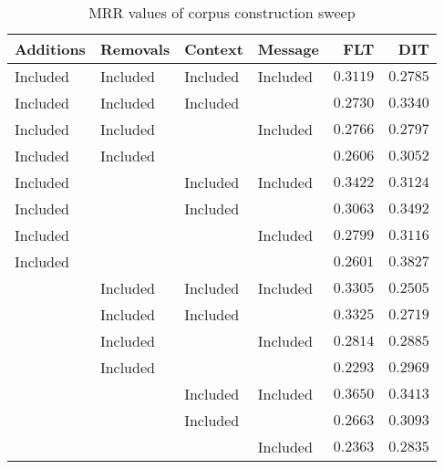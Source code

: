 
\begin{table}
\begin{spacing}{1.2}
\centering
\caption{MRR values of \mahout corpus construction sweep}
\label{table:mahout_corpus_sweep}
\vspace{0.2em}
\begin{tabular}{llll|rr}
\toprule
Additions &  Removals &   Context &   Message &           FLT &           DIT \\
\midrule
 Included &  Included &  Included &  Included &      $0.3119$ &      $0.2785$ \\
 \myrowcolor Included &  Included &  Included &           &      $0.2730$ &      $0.3340$ \\
 Included &  Included &           &  Included &      $0.2766$ &      $0.2797$ \\
 Included &  Included &           &           &      $0.2606$ &      $0.3052$ \\
 Included &           &  Included &  Included &      $0.3422$ &      $0.3124$ \\
 Included &           &  Included &           &      $0.3063$ &      $0.3492$ \\
 Included &           &           &  Included &      $0.2799$ &      $0.3116$ \\
 Included &           &           &           &      $0.2601$ & $\bm{0.3827}$ \\
          &  Included &  Included &  Included &      $0.3305$ &      $0.2505$ \\
          &  Included &  Included &           &      $0.3325$ &      $0.2719$ \\
          &  Included &           &  Included &      $0.2814$ &      $0.2885$ \\
          &  Included &           &           &      $0.2293$ &      $0.2969$ \\
          &           &  Included &  Included & $\bm{0.3650}$ &      $0.3413$ \\
          &           &  Included &           &      $0.2663$ &      $0.3093$ \\
          &           &           &  Included &      $0.2363$ &      $0.2835$ \\
\bottomrule
\end{tabular}

\end{spacing}
\end{table}
